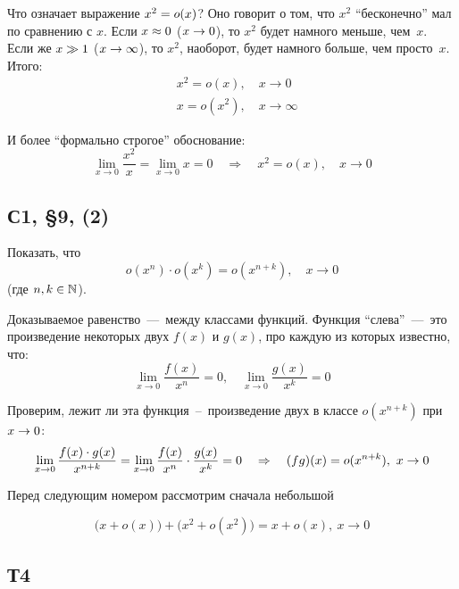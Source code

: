 \documentclass[a4paper,12pt]{article}
\begin{document}
  \begin{solution}
    Что означает выражение $x^2 \hm= o(x)$?
    Оно говорит о том, что $x^2$ ``бесконечно'' мал по сравнению с $x$.
    Если $x \hm\approx 0$ ($x \hm\to 0$), то $x^2$ будет намного меньше, чем~$x$.
    Если же $x \hm\gg 1$ ($x \hm\to \infty$), то $x^2$, наоборот, будет намного больше, чем просто~$x$.
    Итого:
    \[
      \begin{aligned}
        &x^2 = o(x),\quad x \to 0\\
        &x = o(x^2),\quad x \to \infty
      \end{aligned}
    \]
    
    И более ``формально строгое'' обоснование:
    \[
      \lim_{x \to 0} \frac{x^2}{x} = \lim_{x \to 0} x = 0 \quad\Rightarrow\quad x^2 = o(x),\quad x \to 0
    \]
  \end{solution}
  
  
  
  \subsection{С1, \S 9, (2)}
  
  Показать, что
  \[
    o(x^n) \cdot o(x^k) = o(x^{n + k}),\quad x \to 0
  \]
  (где $n, k \in \mathbb N$).
  
  \begin{solution}
    Доказываемое равенство~---~между классами функций.
    Функция ``слева''~---~это произведение некоторых двух $f(x)$ и $g(x)$, про каждую из которых известно, что:
    \[
      \lim_{x \to 0} \frac{f(x)}{x^n} = 0,\quad \lim_{x \to 0} \frac{g(x)}{x^k} = 0
    \]
    
    Проверим, лежит ли эта функция~--~произведение двух в классе $o(x^{n + k})$ при $x \hm\to 0$:
    \[
      \lim_{x \to 0} \frac{f(x) \cdot g(x)}{x^{n + k}} = \lim_{x \to 0} \frac{f(x)}{x^n} \cdot \frac{g(x)}{x^k} = 0
        \quad\Rightarrow\quad (fg)(x) = o(x^{n + k}),\ x \hm\to 0
    \]
  \end{solution}

  
  
  Перед следующим номером рассмотрим сначала небольшой
  
  \begin{example}
    \[
      \bigl(x + o(x)\bigr) + \bigl(x^2 + o(x^2)\bigr) = x + o(x),\ x \to 0
    \]
  \end{example}
  
  
  
  \subsection{Т4}
  
\end{document}
